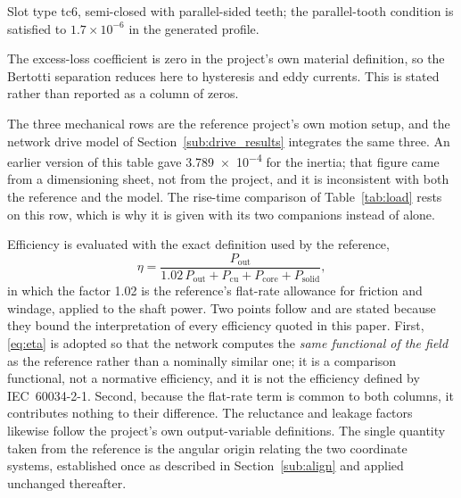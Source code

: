 \documentclass[10pt,a4paper,twocolumn]{article}
\theoremstyle{plain}
\theoremstyle{remark}
\begin{document}
\begin{table}[!ht]
\begin{threeparttable}
\begin{tablenotes}[flushleft]
\item[a] Slot type tc6, semi-closed with parallel-sided teeth; the
parallel-tooth condition is satisfied to $1.7\times10^{-6}$ in the
generated profile.
\item[b] The excess-loss coefficient is zero in the project's own
material definition, so the Bertotti separation reduces here to
hysteresis and eddy currents. This is stated rather than reported as a
column of zeros.
\item[c] The three mechanical rows are the reference project's own
motion setup, and the network drive model of
Section~\ref{sub:drive_results} integrates the same three. An earlier
version of this table gave \num{3.789e-4} for the inertia; that figure
came from a dimensioning sheet, not from the project, and it is
inconsistent with both the reference and the model. The rise-time
comparison of Table~\ref{tab:load} rests on this row, which is why it is
given with its two companions instead of alone.
\end{tablenotes}
\end{threeparttable}
\caption{Data of the test machine, read directly from the
finite-element project. Rows above the rule are geometry, below it
winding and materials.}
\label{tab:machines}
\end{table}

Efficiency is evaluated with the exact definition used by the reference,
\begin{equation}
\eta = \frac{P_{\mathrm{out}}}
{1.02\,P_{\mathrm{out}} + P_{\mathrm{cu}}
 + P_{\mathrm{core}} + P_{\mathrm{solid}}},
\label{eq:eta}
\end{equation}
in which the factor 1.02 is the reference's flat-rate allowance for
friction and windage, applied to the shaft power. Two points follow and
are stated because they bound the interpretation of every efficiency
quoted in this paper. First, \eqref{eq:eta} is adopted so that the
network computes the \emph{same functional of the field} as the
reference rather than a nominally similar one; it is a comparison
functional, not a normative efficiency, and it is not the efficiency
defined by IEC~60034-2-1. Second, because the flat-rate term is common
to both columns, it contributes nothing to their difference. The
reluctance and leakage factors likewise follow the project's own
output-variable definitions. The single quantity taken from the
reference is the angular origin relating the two coordinate systems,
established once as described in Section~\ref{sub:align} and applied
unchanged thereafter.
\end{document}
